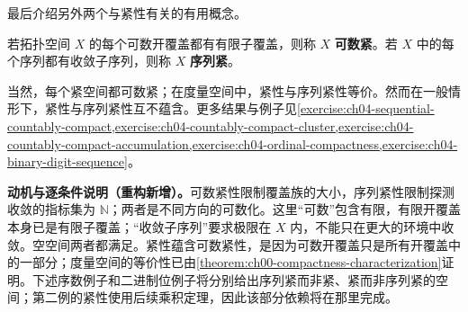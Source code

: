 \documentclass[../../main.tex]{subfiles}%
\begin{document}
最后介绍另外两个与紧性有关的有用概念。
\begin{definition}[可数紧与序列紧]\label{definition:ch04-countable-sequential-compactness}
若拓扑空间 $X$ 的每个可数开覆盖都有有限子覆盖，则称 $X$ \textbf{可数紧}。若 $X$ 中的每个序列都有收敛子序列，则称 $X$ \textbf{序列紧}。
\end{definition}
当然，每个紧空间都可数紧；在度量空间中，紧性与序列紧性等价。然而在一般情形下，紧性与序列紧性互不蕴含。更多结果与例子见\cref{exercise:ch04-sequential-countably-compact,exercise:ch04-countably-compact-cluster,exercise:ch04-countably-compact-accumulation,exercise:ch04-ordinal-compactness,exercise:ch04-binary-digit-sequence}。
\begin{remark}
\textbf{动机与逐条件说明（重构新增）。}可数紧性限制覆盖族的大小，序列紧性限制探测收敛的指标集为 $\mathbb N$；两者是不同方向的可数化。这里“可数”包含有限，有限开覆盖本身已是有限子覆盖；“收敛子序列”要求极限在 $X$ 内，不能只在更大的环境中收敛。空空间两者都满足。紧性蕴含可数紧性，是因为可数开覆盖只是所有开覆盖中的一部分；度量空间的等价性已由\cref{theorem:ch00-compactness-characterization}证明。下述序数例子和二进制位例子将分别给出序列紧而非紧、紧而非序列紧的空间；第二例的紧性使用后续乘积定理，因此该部分依赖将在那里完成。
\end{remark}
\end{document}
